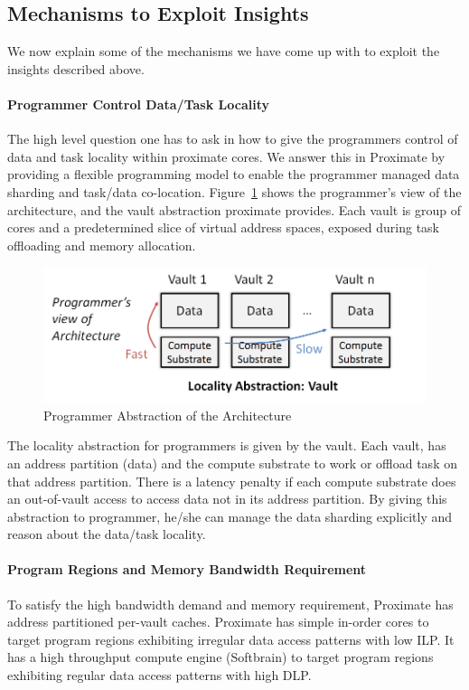 \subsection{Mechanisms to Exploit Insights}

We now explain some of the mechanisms we have come up with to exploit the 
insights described above. 
\paragraph{Programmer Control Data/Task Locality}
The high level question one has to ask in how to give the programmers control
of data and task locality within proximate cores. We answer this
in Proximate by providing a flexible programming model to enable the 
programmer managed data sharding and task/data co-location. 
Figure~\ref{fig:prog-overview} shows the programmer's view of the architecture, 
and the vault abstraction proximate provides. Each vault is group of cores
and a predetermined slice of virtual address spaces, exposed during task offloading 
and memory allocation. 

\begin{figure}
  \begin{center}
    \includegraphics[width=\linewidth]{cs758-figs/prog-abs.png}
  \end{center}
\vspace{-0.2in}
  \caption{Programmer Abstraction of the Architecture}
  \label{fig:prog-overview}
\vspace{-0.05in}
\end{figure}


The locality abstraction for programmers is given by the vault. Each vault, 
has an address partition (data) and the compute substrate to work or offload task
on that address partition. There is a latency penalty if each compute substrate does an 
out-of-vault access to access data not in its address partition. By giving this abstraction to 
programmer, he/she can manage the data sharding explicitly and reason about the data/task locality.

\paragraph{Program Regions and Memory Bandwidth Requirement}To satisfy the high bandwidth demand and memory requirement, Proximate has address partitioned
per-vault caches. Proximate has simple in-order cores to target program regions exhibiting irregular data access patterns with low ILP. 
It has a high throughput compute engine (Softbrain) to target program regions exhibiting regular data access patterns with high DLP.
